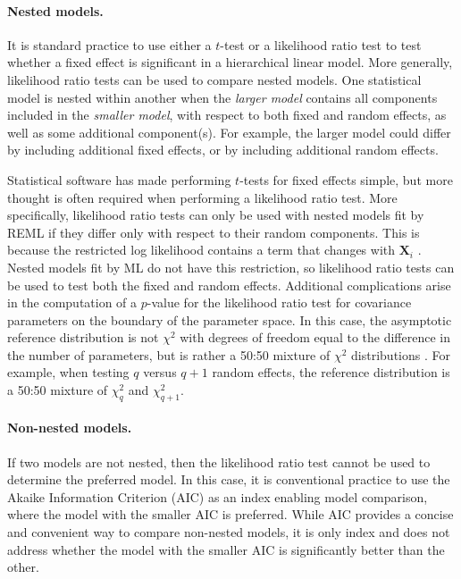 \documentclass{article} %
\begin{document}
\paragraph{Nested models.}
It is standard practice to use either a $t$-test or a likelihood ratio test to test whether a fixed effect is significant in a hierarchical linear model. More generally, likelihood ratio tests can be used to compare nested models. One statistical model is nested within another when the \emph{larger model} contains all components included in the \emph{smaller model}, with respect to both fixed and random effects, as well as some additional component(s). For example, the larger model could differ by including additional fixed effects, or by including additional random effects. 

Statistical software has made performing $t$-tests for fixed effects simple, but more thought is often required when performing a likelihood ratio test. More specifically, likelihood ratio tests can only be used with nested models fit by REML if they differ only with respect to their random components. This is because the restricted log likelihood contains a term that changes with $\bm{X}_i$ \citep[c.f.,][Section 2.2.5]{Pinhiero:2000vf}. Nested models fit by ML do not have this restriction, so likelihood ratio tests can be used to test both the fixed and random effects. Additional complications arise in the computation of a $p$-value for the likelihood ratio test for covariance parameters on the boundary of the parameter space. In this case, the asymptotic reference distribution is not $\chi^2$ with degrees of freedom equal to the difference in the number of parameters, but is rather a 50:50 mixture of $\chi^2$ distributions \citep{Self:1987wb, Stram:1994wd}. For example, when testing $q$ versus $q + 1$ random effects, the reference distribution is a 50:50 mixture of $\chi^2_q$ and $\chi^2_{q+1}$.

\paragraph{Non-nested models.}
If two models are not nested, then the likelihood ratio test cannot be used to determine the preferred model. In this case, it is conventional practice to use the Akaike Information Criterion (AIC) as an index enabling model comparison, where the model with the smaller AIC is preferred. While AIC provides a concise and convenient way to compare non-nested models, it is only index and does not address whether the model with the smaller AIC is significantly better than the other.
\end{document}
